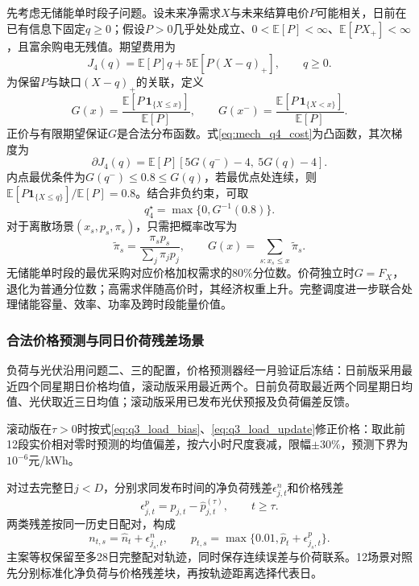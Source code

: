 先考虑无储能单时段子问题。设未来净需求$X$与未来结算电价$P$可能相关，日前在已有信息下固定$q\ge0$；假设$P>0$几乎处处成立、$0<\mathbb E[P]<\infty$、$\mathbb E[PX_+]<\infty$，且富余购电无残值。期望费用为
\begin{equation}
 J_4(q)=\mathbb E[P]q+5\mathbb E[P(X-q)_+],\qquad q\ge0.
 \label{eq:mech_q4_cost}
\end{equation}
为保留$P$与缺口$(X-q)_+$的关联，定义
\begin{equation}
 G(x)=\frac{\mathbb E[P\,\mathbf 1_{\{X\le x\}}]}{\mathbb E[P]},\qquad
 G(x^-)=\frac{\mathbb E[P\,\mathbf 1_{\{X<x\}}]}{\mathbb E[P]}.
 \label{eq:mech_weighted_cdf}
\end{equation}
正价与有限期望保证$G$是合法分布函数。式\eqref{eq:mech_q4_cost}为凸函数，其次梯度为
\begin{equation}
 \partial J_4(q)=\mathbb E[P][5G(q^-)-4,\ 5G(q)-4].
 \label{eq:mech_q4_subgradient}
\end{equation}
内点最优条件为$G(q^-)\le0.8\le G(q)$，若最优点处连续，则
$\mathbb E[P\mathbf 1_{\{X\le q\}}]/\mathbb E[P]=0.8$。结合非负约束，可取
\begin{equation}
 q_4^\star=\max\{0,G^{-1}(0.8)\}.
 \label{eq:mech_weighted_quantile}
\end{equation}
对于离散场景$(x_s,p_s,\pi_s)$，只需把概率改写为
\begin{equation}
 \widetilde\pi_s=\frac{\pi_sp_s}{\sum_j\pi_jp_j},\qquad
 G(x)=\sum_{s:x_s\le x}\widetilde\pi_s.
 \label{eq:mech_scenario_reweight}
\end{equation}
无储能单时段的最优采购对应价格加权需求的80\%分位数。价荷独立时$G=F_X$，退化为普通分位数；高需求伴随高价时，其经济权重上升。完整调度进一步联合处理储能容量、效率、功率及跨时段能量价值。

\subsubsection{合法价格预测与同日价荷残差场景}

负荷与光伏沿用问题二、三的配置，价格预测器经一月验证后冻结：日前版采用最近四个同星期日价格均值，滚动版采用最近两个。日前负荷取最近两个同星期日均值、光伏取近三日均值；滚动版采用已发布光伏预报及负荷偏差反馈。

滚动版在$\tau>0$时按式\eqref{eq:q3_load_bias}、\eqref{eq:q3_load_update}修正价格：取此前12段实价相对零时预测的均值偏差，按六小时尺度衰减，限幅$\pm30\%$，预测下界为$10^{-6}$元/kWh。

对过去完整日$j<D$，分别求同发布时间的净负荷残差$\epsilon^n_{j,t}$和价格残差
\begin{equation}
 \epsilon^p_{j,t}=p_{j,t}-\widehat p^{(\tau)}_{j,t},\qquad t\ge\tau.
 \label{eq:q4_price_residual}
\end{equation}
两类残差按同一历史日配对，构成
\begin{equation}
 n_{t,s}=\widehat n_t+\epsilon^n_{j_s,t},\qquad
 p_{t,s}=\max\{0.01,\widehat p_t+\epsilon^p_{j_s,t}\}.
 \label{eq:joint_scenario}
\end{equation}
主案等权保留至多28日完整配对轨迹，同时保存连续误差与价荷联系。12场景对照先分别标准化净负荷与价格残差块，再按轨迹距离选择代表日。

